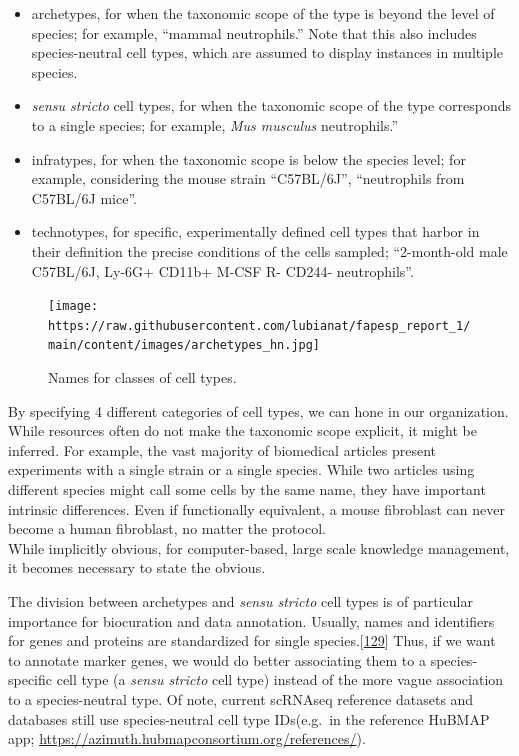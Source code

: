 \begin{itemize}
\tightlist
\item
  archetypes, for when the taxonomic scope of the type is beyond the level of species; for example, ``mammal neutrophils.'' Note that this also includes species-neutral cell types, which are assumed to display instances in multiple species.
\item
  \emph{sensu stricto} cell types, for when the taxonomic scope of the type corresponds to a single species; for example, \emph{Mus musculus} neutrophils.''
\item
  infratypes, for when the taxonomic scope is below the species level; for example, considering the mouse strain ``C57BL/6J'', ``neutrophils from C57BL/6J mice''.
\item
  technotypes, for specific, experimentally defined cell types that harbor in their definition the precise conditions of the cells sampled; ``2-month-old male C57BL/6J, Ly-6G+ CD11b+ M-CSF R- CD244- neutrophils''.
\end{itemize}

\begin{figure}
\hypertarget{fig:classes}{%
\centering
\texttt{[image: https://raw.githubusercontent.com/lubianat/fapesp\_report\_1/main/content/images/archetypes\_hn.jpg]}
\caption{Names for classes of cell types.}\label{fig:classes}
}
\end{figure}

By specifying 4 different categories of cell types, we can hone in our organization.
While resources often do not make the taxonomic scope explicit, it might be inferred.
For example, the vast majority of biomedical articles present experiments with a single strain or a single species.
While two articles using different species might call some cells by the same name, they have important intrinsic differences.
Even if functionally equivalent, a mouse fibroblast can never become a human fibroblast, no matter the protocol.\\
While implicitly obvious, for computer-based, large scale knowledge management, it becomes necessary to state the obvious.

The division between archetypes and \emph{sensu stricto} cell types is of particular importance for biocuration and data annotation.
Usually, names and identifiers for genes and proteins are standardized for single species.{[}\protect\hyperlink{ref-baJRsCMu}{129}{]}
Thus, if we want to annotate marker genes, we would do better associating them to a species-specific cell type (a \emph{sensu stricto} cell type) instead of the more vague association to a species-neutral type.
Of note, current scRNAseq reference datasets and databases still use species-neutral cell type IDs(e.g.~in the reference HuBMAP app; \url{https://azimuth.hubmapconsortium.org/references/}).

